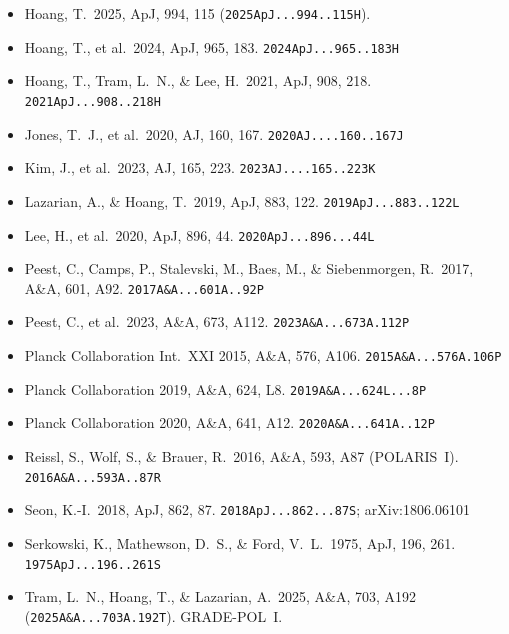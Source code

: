 \documentclass{my_memo}
\newcommand{\code}[1]{\texttt{#1}}
\begin{document}
\begin{itemize}
\item Hoang, T.\ 2025, ApJ, 994, 115 (\code{2025ApJ...994..115H}).

\item Hoang, T., et al.\ 2024, ApJ, 965, 183.
      \code{2024ApJ...965..183H}

\item Hoang, T., Tram, L.~N., \& Lee, H.\ 2021, ApJ, 908, 218.
      \code{2021ApJ...908..218H}

\item Jones, T.~J., et al.\ 2020, AJ, 160, 167.
      \code{2020AJ....160..167J}

\item Kim, J., et al.\ 2023, AJ, 165, 223.
      \code{2023AJ....165..223K}

\item Lazarian, A., \& Hoang, T.\ 2019, ApJ, 883, 122.
      \code{2019ApJ...883..122L}

\item Lee, H., et al.\ 2020, ApJ, 896, 44.
      \code{2020ApJ...896...44L}

\item Peest, C., Camps, P., Stalevski, M., Baes, M., \& Siebenmorgen, R.\
      2017, A\&A, 601, A92. \code{2017A\&A...601A..92P}

\item Peest, C., et al.\ 2023, A\&A, 673, A112.
      \code{2023A\&A...673A.112P}

\item Planck Collaboration Int.\ XXI 2015, A\&A, 576, A106.
      \code{2015A\&A...576A.106P}

\item Planck Collaboration 2019, A\&A, 624, L8.
      \code{2019A\&A...624L...8P}

\item Planck Collaboration 2020, A\&A, 641, A12.
      \code{2020A\&A...641A..12P}

\item Reissl, S., Wolf, S., \& Brauer, R.\ 2016, A\&A, 593, A87
      (POLARIS~I). \code{2016A\&A...593A..87R}

\item Seon, K.-I.\ 2018, ApJ, 862, 87. \code{2018ApJ...862...87S};
      arXiv:1806.06101

\item Serkowski, K., Mathewson, D.~S., \& Ford, V.~L.\ 1975, ApJ, 196,
      261. \code{1975ApJ...196..261S}

\item Tram, L.~N., Hoang, T., \& Lazarian, A.\ 2025, A\&A, 703, A192
      (\code{2025A\&A...703A.192T}). GRADE-POL~I.


\end{itemize}
\end{document}
